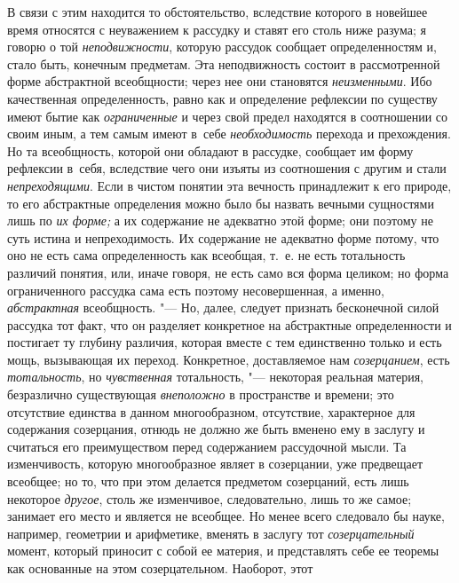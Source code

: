 В связи с этим находится то обстоятельство, вследствие которого в новейшее
время относятся с неуважением к рассудку и ставят его столь ниже
разума; я говорю о той {\em неподвижности}, которую
рассудок сообщает определенностям и, стало быть, конечным предметам. Эта
неподвижность состоит в рассмотренной форме абстрактной всеобщности; через нее
они становятся {\em неизменными}. Ибо качественная определенность, равно как и
определение рефлексии по существу имеют бытие как {\em ограниченные} и через
свой предел находятся в соотношении со своим иным, а тем самым имеют в~себе
{\em необходимость} перехода и прехождения. Но та всеобщность, которой они
обладают в рассудке, сообщает им форму рефлексии в~себя, вследствие чего они
изъяты из соотношения с другим и стали {\em непреходящими}. Если в чистом
понятии эта вечность принадлежит к его природе, то его абстрактные определения
можно было бы назвать вечными сущностями лишь по {\em их форме;} а их
содержание не адекватно этой форме; они поэтому не суть истина и
непреходимость. Их содержание не адекватно форме потому, что оно не есть сама
определенность как всеобщая, т.~е. не есть тотальность различий понятия, или,
иначе говоря, не есть само вся форма целиком; но форма ограниченного рассудка
сама есть поэтому несовершенная, а именно, {\em абстрактная}
всеобщность. "--- Но, далее, следует признать
бесконечной силой рассудка тот факт, что он разделяет конкретное на
абстрактные определенности и постигает ту глубину различия, которая вместе
с тем единственно только и есть мощь, вызывающая их переход. Конкретное,
доставляемое нам {\em созерцанием}, есть {\em тотальность}, но
{\em чувственная} тотальность, "--- некоторая реальная материя,
безразлично существующая {\em внеположно} в
пространстве и времени; это отсутствие единства в данном многообразном,
отсутствие, характерное для содержания созерцания, отнюдь не должно же быть
вменено ему в заслугу и считаться его преимуществом перед содержанием
рассудочной мысли. Та изменчивость, которую многообразное являет в
созерцании, уже предвещает всеобщее; но то, что при этом делается предметом
созерцаний, есть лишь некоторое
{\em другое}, столь же
изменчивое, следовательно, лишь то же самое; занимает его место и является
не всеобщее. Но менее всего следовало бы науке, например, геометрии и
арифметике, вменять в заслугу тот
{\em созерцательный}
момент, который приносит с собой ее материя, и представлять
себе ее теоремы как основанные на этом созерцательном. Наоборот, этот
